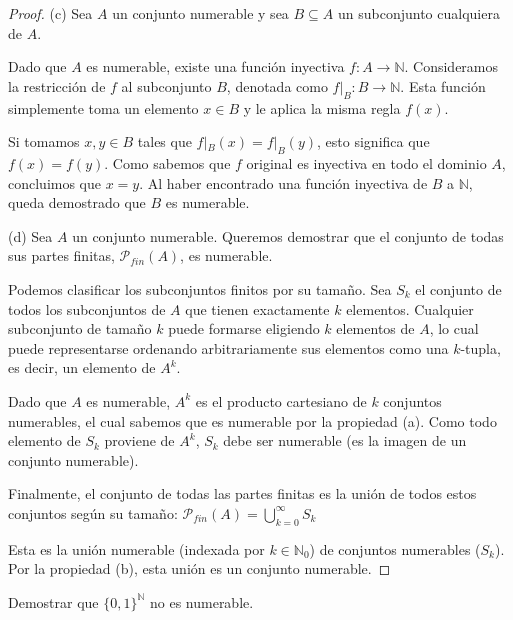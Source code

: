 \documentclass{article}
\theoremstyle{definition}
\newcommand{\N}{\mathbb{N}}
\newenvironment{ejercicio}[1]{\begin{trivlist}
\item[\hskip \labelsep {\bfseries Ejercicio}\hskip \labelsep {\bfseries #1.}]}{\end{trivlist}}
\begin{document}
\begin{proof}
    (c) Sea \(A\) un conjunto numerable y sea \(B \subseteq A\) un subconjunto cualquiera de \(A\).

    Dado que \(A\) es numerable, existe una función inyectiva \(f: A \to \N \).
    Consideramos la restricción de \(f\) al subconjunto \(B\), denotada como \(f|_B : B \to \N \). Esta función simplemente toma un elemento \(x \in B\) y le aplica la misma regla \(f(x)\).

    Si tomamos \(x, y \in B\) tales que \(f|_B(x) = f|_B(y)\), esto significa que \(f(x) = f(y)\). Como sabemos que \(f\) original es inyectiva en todo el dominio \(A\), concluimos que \(x = y\).
    Al haber encontrado una función inyectiva de \(B\) a \(\N \), queda demostrado que \(B\) es numerable.

    (d) Sea \(A\) un conjunto numerable. Queremos demostrar que el conjunto de todas sus partes finitas, \(\mathcal{P}_{fin}(A)\), es numerable.

    Podemos clasificar los subconjuntos finitos por su tamaño. Sea \(S_k\) el conjunto de todos los subconjuntos de \(A\) que tienen exactamente \(k\) elementos.
    Cualquier subconjunto de tamaño \(k\) puede formarse eligiendo \(k\) elementos de \(A\), lo cual puede representarse ordenando arbitrariamente sus elementos como una \(k\)-tupla, es decir, un elemento de \(A^k\).

    Dado que \(A\) es numerable, \(A^k\) es el producto cartesiano de \(k\) conjuntos numerables, el cual sabemos que es numerable por la propiedad (a). Como todo elemento de \(S_k\) proviene de \(A^k\), \(S_k\) debe ser numerable (es la imagen de un conjunto numerable).

    Finalmente, el conjunto de todas las partes finitas es la unión de todos estos conjuntos según su tamaño:
    \(\mathcal{P}_{fin}(A) = \bigcup_{k=0}^{\infty} S_k\)

    Esta es la unión numerable (indexada por \(k \in \N_0\)) de conjuntos numerables (\(S_k\)). Por la propiedad (b), esta unión es un conjunto numerable.

\end{proof}

\begin{ejercicio}{11}
    Demostrar que \( {\{0,1\}}^{\N} \) no es numerable.
\end{ejercicio}
\end{document}
